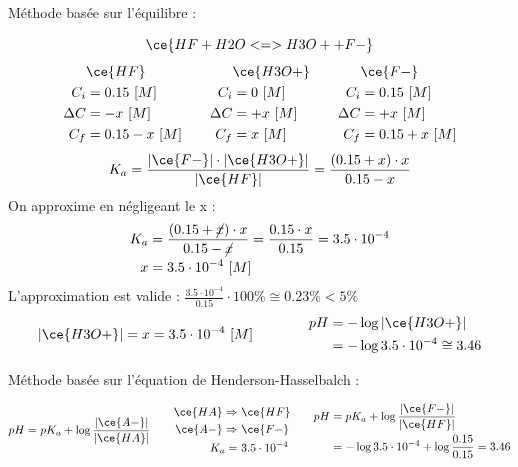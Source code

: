 \documentclass[
  11pt,
  a4paper,
  openany]{book}
\begin{document}
\begin{Answer}
Méthode basée sur l'équilibre :

\[
\ce{HF + H2O <=> H3O+ + F-}
\]
\[
\begin{split}
&\ce{HF}\\
C_i &= 0.15\ [M] \\
\Delta C &= - x\ [M] \\
C_f &= 0.15 - x\ [M] \\
\end{split}
\qquad
\begin{split}
&\ce{H3O+}\\
C_i &= 0\ [M] \\
\Delta C &= + x\ [M] \\
C_f &= x\ [M] \\
\end{split}
\qquad
\begin{split}
&\ce{F-}\\
C_i &= 0.15\ [M] \\
\Delta C &= + x\ [M] \\
C_f &= 0.15 + x\ [M] \\
\end{split}
\]
\[
K_a = \frac{|\ce{F-}| \cdot |\ce{H3O+}|}{|\ce{HF}|} = \frac{(0.15 + x) \cdot x}{0.15 - x}
\]
On approxime en négligeant le x :
\[
\begin{split}
K_a &= \frac{(0.15 + \cancel{x}) \cdot x}{0.15 - \cancel{x}} = \frac{0.15 \cdot x}{0.15} = 3.5 \cdot 10^{-4} \\
x &= 3.5 \cdot 10^{-4}\ [M]
\end{split}
\]
L'approximation est valide : \(\frac{3.5 \cdot 10^{-4}}{0.15} \cdot 100\% \cong 0.23\% < 5\%\)
\[
\begin{split}
|\ce{H3O+}| = x = 3.5 \cdot 10^{-4}\ [M]
\end{split}
\qquad\qquad
\begin{split}
pH &= - \log |\ce{H3O+}| \\
 &= - \log 3.5 \cdot 10^{-4} \cong 3.46
\end{split}
\]

Méthode basée sur l'équation de Henderson-Hasselbalch :

\[
\begin{split}
  pH = pK_a + \log \frac{|\ce{A-}|}{|\ce{HA}|}
\end{split}
\qquad
\begin{split}
  \ce{HA} \Rightarrow &\ \ce{HF} \\
  \ce{A-} \Rightarrow &\ \ce{F-} \\
  K_a = &\ 3.5 \cdot 10^{-4}
\end{split}
\qquad
\begin{split}
  pH &= pK_a + \log \frac{|\ce{F-}|}{|\ce{HF}|} \\
  &= - \log 3.5 \cdot 10^{-4} + \log \frac{0.15}{0.15} = 3.46 \\
\end{split}
\]

\end{Answer}
\end{document}
